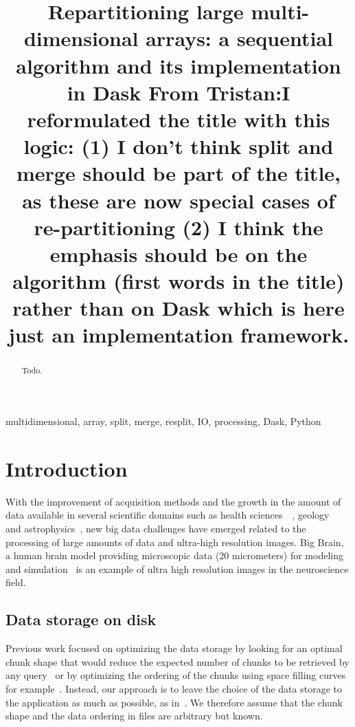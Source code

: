 \documentclass[conference]{IEEEtran}
\newcommand{\tristan}[1]{\color{orange}\textbf{From Tristan:}#1\color{black}}
\begin{document}
\title{Repartitioning large multi-dimensional arrays: a sequential algorithm and its implementation in Dask
\tristan{I reformulated the title with this logic: (1) I don't think split and merge should be part of the title, as these are now special cases of re-partitioning
 (2) I think the emphasis should be on the algorithm (first words in the title) rather than on Dask which is here just an implementation framework.}}

\author{
}

\maketitle

\begin{abstract}
Todo.
\end{abstract}

\begin{IEEEkeywords}
multidimensional, array, split, merge, resplit, IO, processing, Dask, Python
\end{IEEEkeywords}

\section{Introduction}
With the improvement of acquisition methods and the growth in the amount of data
available in several scientific domains such as health
sciences~\cite{bigdata_health}~\cite{Amunts1472}, geology~\cite{big_data_geology}
and astrophysics~\cite{biguniverse}, new big data challenges have emerged related
to the processing of large amounts of data and ultra-high resolution
images. Big Brain, a human brain model providing microscopic data (20 micrometers) for
modeling and simulation~\cite{Amunts1472} is an example of ultra high resolution
images in the neuroscience field.

\subsection{Data storage on disk}
Previous work focused on optimizing the data storage by looking for an optimal
chunk shape that would reduce the expected number of chunks to be retrieved by
any query~\cite{optimal_chuking} or by optimizing the ordering of the chunks
using space filling curves for example~\cite{optimal_chuking, openconnectomecluster}.
Instead, our approach is to leave the choice of the
data storage to the application as much as possible, as in~\cite{seqalgorithms}.
We therefore assume that
the chunk shape and the data ordering in files are arbitrary but known.
\end{document}
